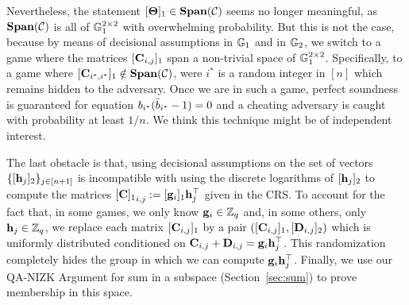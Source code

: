 Nevertheless, the statement $[\mathbf{{\Theta}}]_1\in\mathbf{Span}(\mathcal{C})$ seems no longer meaningful, as $\mathbf{Span}(\mathcal{C})$ is all of $\mathbb{G}_1^{2\times 2}$ with overwhelming probability. But this is not the case, because by means of decisional assumptions in $\mathbb{G}_1$ and in $\mathbb{G}_2$, we switch to a game where the matrices
$[\mathbf{{C}}_{i,j}]_1$ span a non-trivial space of $\mathbb{G}_1^{2 \times 2}$. Specifically, to a game where $[\mathbf{{C}}_{i^*,i^*}]_1\notin\mathbf{Span}(\mathcal{C})$, were $i^*$ is a random integer in $[n]$ which remains hidden to the adversary. Once we are in such a game, perfect soundness is guaranteed for equation $b_{i^*}(\bar{b}_{i^*}-1)=0$ and a cheating adversary is caught with probability at least $1/n$. We think this technique might be of independent interest.

The last obstacle is that, 
  using decisional assumptions on the set of vectors 
  $\{[\mathbf{h}_{j}]_2\}_{j\in[n+1]}$ is incompatible with using the discrete logarithms of $[\mathbf{h}_j]_2$ to compute the matrices ${[\mathbf{{C}}]_1}_{i,j}:=[\mathbf{g}_i]_1 \mathbf{h}_j^{\top}$ given in the CRS. 
To account for the fact that, in some games,
  we only know $\mathbf{g}_i \in \mathbb{Z}_q$ and, in some others,
  only $\mathbf{h}_j \in \mathbb{Z}_q$, we replace each matrix 
  $[\mathbf{{C}}_{i,j}]_1$ by a pair 
  $([\mathbf{{C}}_{i,j}]_1,[\mathbf{{D}}_{i,j}]_2)$ which is uniformly 
  distributed conditioned on 
  $\mathbf{{C}}_{i,j}+\mathbf{{D}}_{i,j}=\mathbf{g}_i \mathbf{h}_j^{\top}$.
This randomization completely hides the group in which we can compute 
  $\mathbf{g}_i \mathbf{h}_j^{\top}$. 
  Finally, we use our QA-NIZK Argument for sum in a subspace (Section~\ref{sec:sum}) to prove membership in this space.

